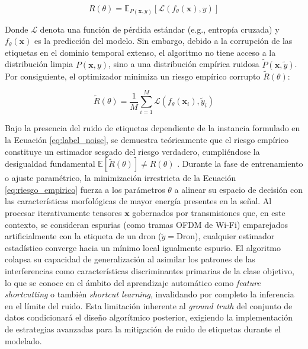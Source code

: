 \begin{equation}
    R(\theta) = \mathbb{E}_{P(\mathbf{x}, y)} \left[ \mathcal{L}(f_\theta(\mathbf{x}), y) \right]
    \label{eq:riesgo_teorico}
\end{equation}

Donde $\mathcal{L}$ denota una función de pérdida estándar (e.g., entropía cruzada) y $f_\theta(\mathbf{x})$ es la predicción del modelo. Sin embargo, debido a la corrupción de las etiquetas en el dominio temporal extenso, el algoritmo no tiene acceso a la distribución limpia $P(\mathbf{x}, y)$, sino a una distribución empírica ruidosa $\tilde{P}(\mathbf{x}, \tilde{y})$. Por consiguiente, el optimizador minimiza un riesgo empírico corrupto $\tilde{R}(\theta)$:

\begin{equation}
    \tilde{R}(\theta) = \frac{1}{M} \sum_{i=1}^{M} \mathcal{L}(f_\theta(\mathbf{x}_i), \tilde{y}_i)
    \label{eq:riesgo_empirico}
\end{equation}

Bajo la presencia del ruido de etiquetas dependiente de la instancia formulado en la Ecuación \ref{eq:label_noise}, se demuestra teóricamente que el riesgo empírico constituye un estimador sesgado del riesgo verdadero, cumpliéndose la desigualdad fundamental $\mathbb{E}[\tilde{R}(\theta)] \neq R(\theta)$ \cite{natarajan_learning_2013, song_learning_2022}. Durante la fase de entrenamiento o ajuste paramétrico, la minimización irrestricta de la Ecuación \ref{eq:riesgo_empirico} fuerza a los parámetros $\theta$ a alinear su espacio de decisión con las características morfológicas de mayor energía presentes en la señal. Al procesar iterativamente tensores $\mathbf{x}$ gobernados por transmisiones que, en este contexto, se consideran espurias (como tramas OFDM de Wi-Fi) emparejados artificialmente con la etiqueta de un dron ($\tilde{y} = \text{Dron}$), cualquier estimador estadístico converge hacia un mínimo local igualmente espurio. El algoritmo colapsa su capacidad de generalización al asimilar los patrones de las interferencias como características discriminantes primarias de la clase objetivo, lo que se conoce en el ámbito del aprendizaje automático como \textit{feature shortcutting} o también \textit{shortcut learning}, invalidando por completo la inferencia en el límite del ruido. Esta limitación inherente al \textit{ground truth} del conjunto de datos condicionará el diseño algorítmico posterior, exigiendo la implementación de estrategias avanzadas para la mitigación de ruido de etiquetas durante el modelado.

